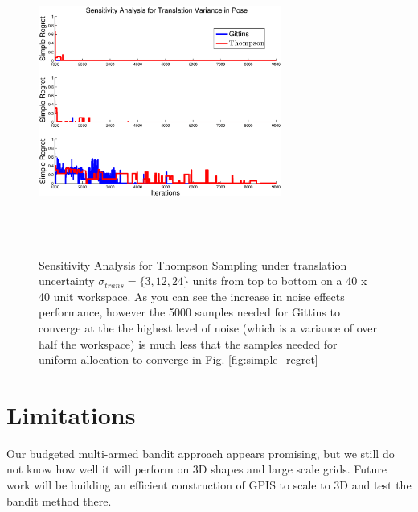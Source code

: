 \documentclass[journal,transmag]{IEEEtran}%
\begin{document}
\begin{figure}[ht!]
\centering
\includegraphics[width = 8cm, height = 10cm]{matlab_figures/sensitivity_trans.eps}
\caption{ \footnotesize Sensitivity Analysis for Thompson Sampling under translation uncertainty $\sigma_{trans} = \lbrace 3, 12, 24 \rbrace$ units from top to bottom on a 40 x 40 unit workspace.  As you can see the increase in noise effects performance, however the 5000 samples needed for Gittins to  converge at the the highest level of noise (which is a variance of over half the workspace) is much less that the samples needed for uniform allocation to converge in Fig. \ref{fig:simple_regret}}
\vspace*{-10pt}
\label{fig:trans_sens}
\end{figure}






\section{Limitations} 

Our budgeted multi-armed bandit approach appears promising, but we still do not know how well it will perform on 3D shapes and large scale grids. Future work will be building an efficient construction of GPIS to scale to 3D and test the bandit method there. 
\end{document}
